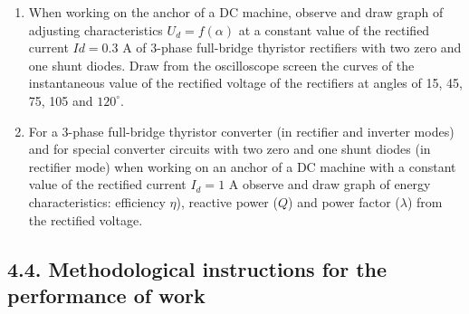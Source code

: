 \documentclass[a4paper,14pt]{article}
\begin{document}
\begin{enumerate}
	\item\label{taskIIfirst} When working on the anchor of a DC machine, observe and draw graph of
adjusting characteristics $U_d = f(\alpha)$ at a constant value of the rectified current $Id = 0.3$ A of 3-phase 
full-bridge thyristor rectifiers with two zero and one shunt diodes.
Draw from the oscilloscope screen the curves of the instantaneous value of the rectified voltage of the rectifiers at angles of 15, 45, 75, 105 and $120^\circ$.

\item For a 3-phase full-bridge thyristor converter (in rectifier and inverter modes) and for special converter circuits with two zero and one shunt diodes (in rectifier mode) when working on an anchor of a DC machine with a constant value of the rectified current $I_d = 1$ A observe and draw graph of energy characteristics: 
	efficiency $\eta$), reactive power ($Q$) and power factor ($\lambda$) from the rectified voltage.
\end{enumerate} 

\subsection{4.4. Methodological instructions for the performance of work}
\end{document}
